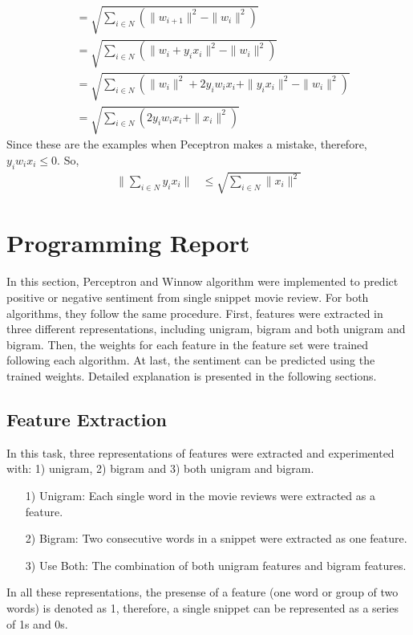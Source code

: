 \documentclass[11pt]{article}
\begin{document}
\begin{itemize}
\begin{align*}
													& = \sqrt{\sum_{i\in N} (\|w_{i+1}\|^2-\|w_i\|^2)} \\
													& = \sqrt{\sum_{i\in N} (\|w_i+y_i x_i\|^2-\|w_i\|^2)} \\
													& = \sqrt{\sum_{i\in N} (\|w_i\|^2+2y_i w_i x_i+\|y_i x_i\|^2-\|w_i\|^2)} \\
													& = \sqrt{\sum_{i\in N} (2y_i w_i x_i+\|x_i\|^2)}
\end{align*}
Since these are the examples when Peceptron makes a mistake, therefore, \(y_i w_i x_i\leq 0\). So,
\begin{align*}
\|\sum_{i\in N} y_i x_i\| & \leq \sqrt{\sum_{i\in N} \|x_i\|^2}
\end{align*}
\end{itemize}


\section{Programming Report}
In this section, Perceptron and Winnow algorithm were implemented to predict positive or negative sentiment from single snippet movie review. For both algorithms, they follow the same procedure. First, features were extracted in three different representations, including unigram, bigram and both unigram and bigram. Then, the weights for each feature in the feature set were trained following each algorithm. At last, the sentiment can be predicted using the trained weights. Detailed explanation is presented in the following sections.
\subsection{Feature Extraction}
In this task, three representations of features were extracted and experimented with: 1) unigram, 2) bigram and 3) both unigram and bigram.
\begin{itemize}
\item[1)] Unigram: Each single word in the movie reviews were extracted as a feature.
\item[2)] Bigram: Two consecutive words in a snippet were extracted as one feature.
\item[3)] Use Both: The combination of both unigram features and bigram features.
\end{itemize}
In all these representations, the presense of a feature (one word or group of two words) is denoted as 1, therefore, a single snippet can be represented as a series of 1s and 0s.
\end{document}
